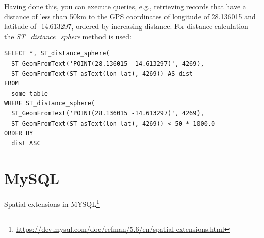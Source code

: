 \documentclass[a4paper]{book}
\begin{document}
\noindent Having done this, you can execute queries, e.g., retrieving records that have
a distance of less than 50km to the GPS coordinates of longitude of 28.136015
and latitude of -14.613297, ordered by increasing distance. For distance
calculation the \textit{ST\_distance\_sphere} method is used:
\begin{verbatim}
SELECT *, ST_distance_sphere(
  ST_GeomFromText('POINT(28.136015 -14.613297)', 4269),
  ST_GeomFromText(ST_asText(lon_lat), 4269)) AS dist
FROM
  some_table
WHERE ST_distance_sphere(
  ST_GeomFromText('POINT(28.136015 -14.613297)', 4269),
  ST_GeomFromText(ST_asText(lon_lat), 4269)) < 50 * 1000.0
ORDER BY
  dist ASC
\end{verbatim}


\section{MySQL}
Spatial extensions in MYSQL\footnote{\url{https://dev.mysql.com/doc/refman/5.6/en/spatial-extensions.html}{}}



\end{document}
